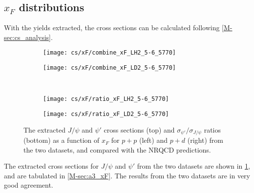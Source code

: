 \documentclass[../main.tex]{subfiles}
\begin{document}
\subsection{\texorpdfstring{$x_F$}{x\_F} distributions}
With the yields extracted, the cross sections  can be calculated following \cref{M-sec:cs_analysis}.
\begin{figure}[h!]
	\centering
	\begin{subfigure}{0.48\linewidth}
		\texttt{[image: cs/xF/combine\_xF\_LH2\_5-6\_5770]}
	\end{subfigure}
	\centering
	\begin{subfigure}{0.48\linewidth}
		\texttt{[image: cs/xF/combine\_xF\_LD2\_5-6\_5770]}
	\end{subfigure}
	\\
	\begin{subfigure}{0.48\linewidth}
		\texttt{[image: cs/xF/ratio\_xF\_LH2\_5-6\_5770]}
	\end{subfigure}
	\begin{subfigure}{0.48\linewidth}
		\texttt{[image: cs/xF/ratio\_xF\_LD2\_5-6\_5770]}
	\end{subfigure}
	\caption{The extracted $J/\psi$ and $\psi'$ cross sections (top) and $\sigma_{\psi'}/\sigma_{J/\psi}$
		ratios (bottom) as a function of $x_F$ for $p+p$ (left) and $p+d$ (right) from the two datasets,
		and compared with the NRQCD predictions.}
	\label{fig:cs_xF}
\end{figure}
The extracted cross sections for $J/\psi$ and $\psi'$ from the two datasets are shown in \cref{fig:cs_xF}, and are
tabulated in \cref{M-sec:a3_xF}.
The results from the two datasets are in very good agreement.
\FloatBarrier
\end{document}
